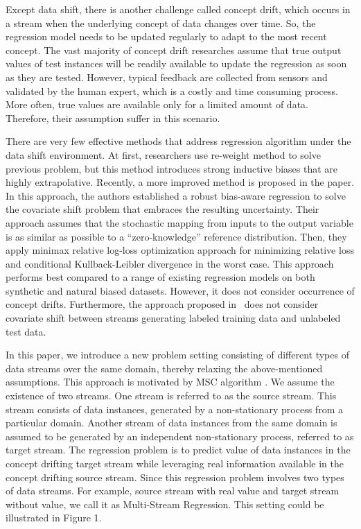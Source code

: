\documentclass[conference,compsoc]{IEEEtran}
\begin{document}
Except data shift, there is another challenge called concept drift\cite{Parker}, which  occurs  in  a  stream  when  the  underlying concept of data changes over time. So, the  regression model needs  to  be  updated  regularly to adapt  to  the  most  recent concept. The  vast  majority  of  concept  drift  researches assume  that  true  output values  of  test instances  will  be  readily  available  to  update  the  regression  as 
soon  as  they  are  tested.  However,  typical  feedback 
are collected from sensors and validated by the human expert, which  is  a  costly  and  time consuming process. More often, true values are available only for a limited amount of data. Therefore, their  assumption suffer in this scenario.

There are very few effective methods that address regression algorithm under the data shift environment. At first, researchers use re-weight method to solve previous problem, but this method introduces strong inductive biases that are highly extrapolative. Recently, a more improved method is proposed in the paper\cite{chen,herlihy:methodology,Fear05}. In this approach, the authors
established a robust bias-aware regression to solve the covariate shift problem that embraces the resulting uncertainty. Their approach assumes that the stochastic mapping from inputs to the output variable is as similar as possible to a ``zero-knowledge'' reference distribution. Then, they apply minimax relative log-loss optimization approach for minimizing relative loss and conditional Kullback-Leibler divergence in the worst case. This approach performs best compared to a range of existing regression models on both synthetic and natural biased datasets. However, it does not consider occurrence of concept drifts. Furthermore, the approach proposed in~\cite{chen,herlihy:methodology,Fear05} does not consider covariate shift between streams generating labeled training data and unlabeled test data.
  
  In  this  paper,  we  introduce  a  new  problem  setting  consisting of different types of data streams over the same domain, thereby relaxing the above-mentioned assumptions. This approach is motivated by MSC algorithm \cite{chandra2016}. We assume the existence of two streams. One stream is referred to as the source stream. This stream consists of data instances, generated by a non-stationary process from a particular domain. Another  stream  of  data  instances from the same domain is assumed to be generated by an independent non-stationary process, referred to as target stream. The regression problem is to predict value of data instances in  the concept  drifting target stream  while  leveraging  real  information  available  in  the  concept  drifting source stream. Since this regression problem involves two types of  data  streams. For example, source  stream with real value and target stream without value, we call it as Multi-Stream Regression. This setting could be illustrated in Figure 1.  
  
\end{document}
